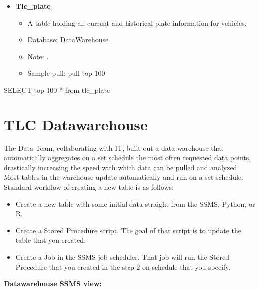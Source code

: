 \documentclass[
]{book}
\newenvironment{Shaded}{\begin{snugshade}}{\end{snugshade}}
\newcommand{\DecValTok}[1]{\textcolor[rgb]{0.00,0.00,0.81}{#1}}
\newcommand{\NormalTok}[1]{#1}
\newcommand{\SpecialCharTok}[1]{\textcolor[rgb]{0.00,0.00,0.00}{#1}}
\providecommand{\tightlist}{%
  \setlength{\itemsep}{0pt}\setlength{\parskip}{0pt}}
\begin{document}
\begin{itemize}
\tightlist
\item
  \textbf{Tlc\_plate}

  \begin{itemize}
  \tightlist
  \item
    A table holding all current and historical plate information for vehicles.
  \item
    Database: DataWarehouse
  \item
    Note: .
  \item
    Sample pull: pull top 100
  \end{itemize}
\end{itemize}

\begin{Shaded}
\begin{Highlighting}[]
\NormalTok{SELECT top }\DecValTok{100} \SpecialCharTok{*}
\NormalTok{     from tlc\_plate}
\end{Highlighting}
\end{Shaded}

\hypertarget{tlc-datawarehouse}{%
\section{TLC Datawarehouse}\label{tlc-datawarehouse}}

The Data Team, collaborating with IT, built out a data warehouse that automatically aggregates on a set schedule the most often requested data points, drastically increasing the speed with which data can be pulled and analyzed. Most tables in the warehouse update automatically and run on a set schedule. Standard workflow of creating a new table is as follows:

\begin{itemize}
\item
  Create a new table with some initial data straight from the SSMS, Python, or R.
\item
  Create a Stored Procedure script. The goal of that script is to update the table that you created.
\item
  Create a Job in the SSMS job scheduler. That job will run the Stored Procedure that you created in the step 2 on schedule that you specify.
\end{itemize}

\textbf{Datawarehouse SSMS view:}
\end{document}
